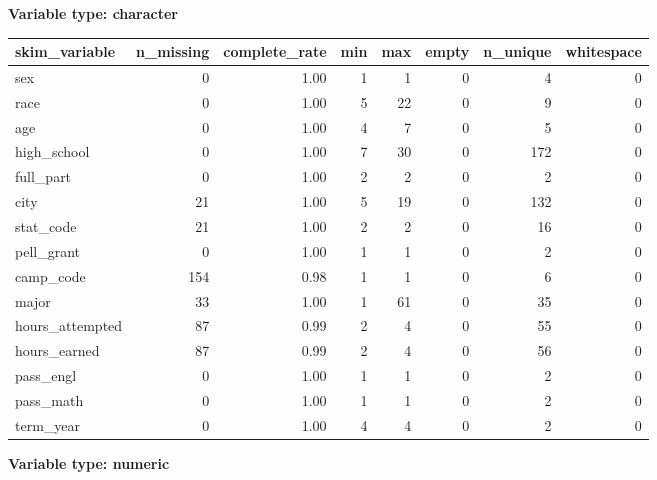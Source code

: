\documentclass[]{article}
\begin{document}
\textbf{Variable type: character}

\begin{longtable}[]{@{}lrrrrrrr@{}}
\toprule
skim\_variable & n\_missing & complete\_rate & min & max & empty &
n\_unique & whitespace\tabularnewline
\midrule
\endhead
sex & 0 & 1.00 & 1 & 1 & 0 & 4 & 0\tabularnewline
race & 0 & 1.00 & 5 & 22 & 0 & 9 & 0\tabularnewline
age & 0 & 1.00 & 4 & 7 & 0 & 5 & 0\tabularnewline
high\_school & 0 & 1.00 & 7 & 30 & 0 & 172 & 0\tabularnewline
full\_part & 0 & 1.00 & 2 & 2 & 0 & 2 & 0\tabularnewline
city & 21 & 1.00 & 5 & 19 & 0 & 132 & 0\tabularnewline
stat\_code & 21 & 1.00 & 2 & 2 & 0 & 16 & 0\tabularnewline
pell\_grant & 0 & 1.00 & 1 & 1 & 0 & 2 & 0\tabularnewline
camp\_code & 154 & 0.98 & 1 & 1 & 0 & 6 & 0\tabularnewline
major & 33 & 1.00 & 1 & 61 & 0 & 35 & 0\tabularnewline
hours\_attempted & 87 & 0.99 & 2 & 4 & 0 & 55 & 0\tabularnewline
hours\_earned & 87 & 0.99 & 2 & 4 & 0 & 56 & 0\tabularnewline
pass\_engl & 0 & 1.00 & 1 & 1 & 0 & 2 & 0\tabularnewline
pass\_math & 0 & 1.00 & 1 & 1 & 0 & 2 & 0\tabularnewline
term\_year & 0 & 1.00 & 4 & 4 & 0 & 2 & 0\tabularnewline
\bottomrule
\end{longtable}

\textbf{Variable type: numeric}
\end{document}
